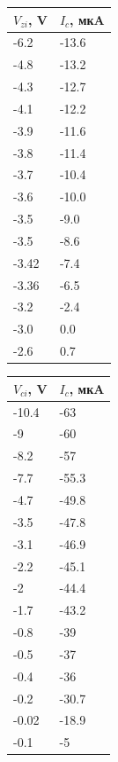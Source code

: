 \documentclass[a4paper,14pt]{article}
\begin{document}
\begin{table}[H]
	\begin{center}
		\begin{tabular}{|l|l|}
			\hline
			$V_{zi}$, V & $I_c$, мкA \\ \hline
			-6.2	&	-13.6\\ \hline
			-4.8	&	-13.2\\ \hline
			-4.3	&	-12.7\\ \hline
			-4.1	&	-12.2\\ \hline
			-3.9	&	-11.6\\ \hline
			-3.8	&	-11.4\\ \hline
			-3.7	&	-10.4\\ \hline
			-3.6	&	-10.0\\ \hline
			-3.5	&	-9.0\\ \hline
			-3.5	&	-8.6\\ \hline
			-3.42	&	-7.4\\ \hline
			-3.36	&	-6.5\\ \hline
			-3.2	&	-2.4\\ \hline
			-3.0	&	0.0\\ \hline
			-2.6	&	0.7\\ \hline
		\end{tabular}
	\end{center}
\end{table}

\begin{table}[H]
	\begin{center}
		\begin{tabular}{|l|l|}
			\hline
			$V_{ci}$, V & $I_c$, мкA \\ \hline
			-10.4	&	-63 \\ \hline
			-9	&	-60 \\ \hline
			-8.2	&	-57 \\ \hline
			-7.7	&	-55.3 \\ \hline
			-4.7	&	-49.8 \\ \hline
			-3.5	&	-47.8 \\ \hline
			-3.1	&	-46.9 \\ \hline
			-2.2	&	-45.1 \\ \hline
			-2	&	-44.4 \\ \hline
			-1.7	&	-43.2 \\ \hline
			-0.8	&	-39 \\ \hline
			-0.5	&	-37 \\ \hline
			-0.4	&	-36 \\ \hline
			-0.2	&	-30.7 \\ \hline
			-0.02	&	-18.9 \\ \hline
			-0.1	&	-5 \\ \hline
		\end{tabular}
	\end{center}
\end{table}
\end{document}
